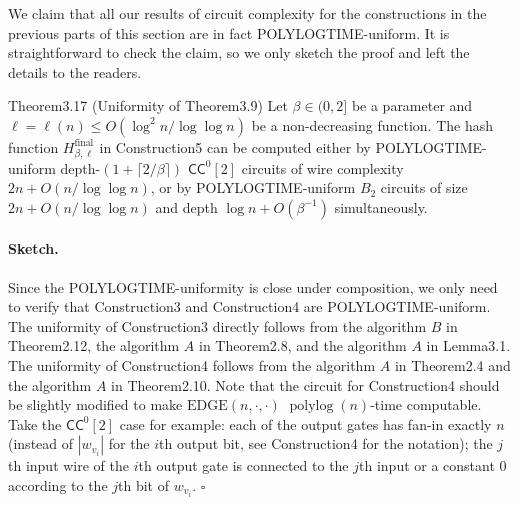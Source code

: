 We claim that all our results of circuit complexity for the constructions in the previous parts of this section are in fact POLYLOGTIME-uniform. It is straightforward to check the claim, so we only sketch the proof and left the details to the readers.
\begin{authorclaim}{Theorem3.17 (Uniformity of Theorem3.9)}
Let $\beta\in(0,2]$ be a parameter and $\ell=\ell(n)\le O(\log^2n/\log\log n)$ be a non-decreasing function. The hash function $H^{\mathrm{final}}_{\beta,\ell}$ in Construction5 can be computed either by POLYLOGTIME-uniform depth-$(1+\lceil2/\beta\rceil)$ $\mathsf{CC}^0[2]$ circuits of wire complexity $2n+O(n/\log\log n)$, or by POLYLOGTIME-uniform $B_2$ circuits of size $2n+O(n/\log\log n)$ and depth $\log n+O(\beta^{-1})$ simultaneously.
\end{authorclaim}
\paragraph{Sketch.}
Since the POLYLOGTIME-uniformity is close under composition, we only need to verify that Construction3 and Construction4 are POLYLOGTIME-uniform. The uniformity of Construction3 directly follows from the algorithm $B$ in Theorem2.12, the algorithm $A$ in Theorem2.8, and the algorithm $A$ in Lemma3.1. The uniformity of Construction4 follows from the algorithm $A$ in Theorem2.4 and the algorithm $A$ in Theorem2.10. Note that the circuit for Construction4 should be slightly modified to make $\mathrm{EDGE}(n,\cdot,\cdot)$ $\operatorname{polylog}(n)$-time computable. Take the $\mathsf{CC}^0[2]$ case for example: each of the output gates has fan-in exactly $n$ (instead of $|w_{v_i}|$ for the $i$th output bit, see Construction4 for the notation); the $j$th input wire of the $i$th output gate is connected to the $j$th input or a constant 0 according to the $j$th bit of $w_{v_i}$. \hfill$\square$
